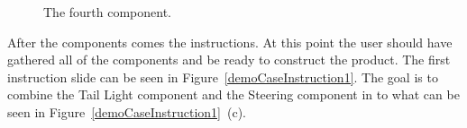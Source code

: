 	\begin{figure}[ht!]
		\centering
		\qquad
		\qquad
		\caption{The fourth component.}
		\label{demoCasePirate}
	\end{figure}

After the components comes the instructions. At this point the user should have gathered all of the components and be ready to construct the product. The first instruction slide can be seen in Figure~\ref{demoCaseInstruction1}. The goal is to combine the Tail Light component and the Steering component in to what can be seen in Figure~\ref{demoCaseInstruction1}~(c).

